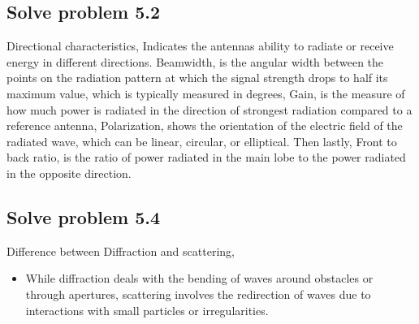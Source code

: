 \documentclass{article}
\begin{document}
\subsection{Solve problem 5.2}
Directional characteristics, Indicates the antennas ability to radiate or receive energy in different directions. Beamwidth, is the angular width between the points on the radiation pattern at which the signal strength drops to half its maximum value, which is typically measured in degrees, Gain, is the measure of how much power is radiated in the direction of strongest radiation compared to a reference antenna, Polarization, shows the orientation of the electric field of the radiated wave, which can be linear, circular, or elliptical. Then lastly, Front to back ratio, is the ratio of power radiated in the main lobe to the power radiated in the opposite direction.

\subsection{Solve problem 5.4}
Difference between Diffraction and scattering,
\begin{itemize}
\item While diffraction deals with the bending of waves around obstacles or through apertures, scattering involves the redirection of waves due to interactions with small particles or irregularities.
\end{itemize}
\end{document}
